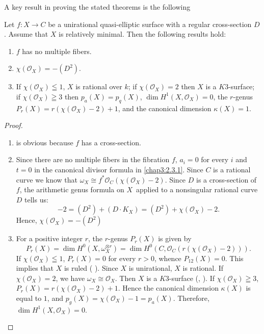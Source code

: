 \subsubsection{}\label{chap3:2.3.2}
A key result in proving the stated theorems is the following
\begin{lemma*}
Let $f:X\to C$ be a unirational quasi-elliptic surface with a regular
cross-section $D$. Assume that $X$ is relatively minimal. Then the
following results hold:
\begin{enumerate}
\renewcommand{\labelenumi}{\rm(\theenumi)}
\item $f$ has no multiple fibers.

\item $\chi(\mathscr{O}_{X})=-(D^{2})$.

\item If $\chi(\mathscr{O}_{X})\leqq 1$, $X$ is rational over $k$; if
  $\chi(\mathscr{O}_{X})=2$ then $X$ is a $K3$-surface; if
  $\chi(\mathscr{O}_{X})\geqq 3$ then $p_{a}(X)=p_{q}(X)$, $\dim
  H^{1}(X,\mathscr{O}_{X})=0$, the $r$-genus
  $P_{r}(X)=r(\chi(\mathscr{O}_{X})-2)+1$, and the canonical dimension
  $\kappa(X)=1$. 
\end{enumerate}
\end{lemma*}

\begin{proof}
\begin{enumerate}
\renewcommand{\labelenumi}{(\theenumi)}
\item is obvious because $f$ has a cross-section. 

\item Since there are no multiple fibers in the fibration $f$,
  $a_{i}=0$ for every $i$ and $t=0$ in the canonical divisor formula
  in \ref{chap3:2.3.1}. Since $C$ is a rational curve we know that
  $\omega_{X}\cong
  f^{\ast}\mathscr{O}_{C}(\chi(\mathscr{O}_{X})-2)$. Since $D$ is a
  cross-section of $f$, the arithmetic genus formula on
  $X$\pageoriginale\ applied to a nonsingular rational curve $D$ tells
  us:
$$
-2=(D^{2})+(D\cdot K_{X})=(D^{2})+\chi(\mathscr{O}_{X})-2.
$$
Hence, $\chi(\mathscr{O}_{X})=-(D^{2})$ 

\item For a positive integer $r$, the $r$-genus $P_{r}(X)$ is given by
$$
P_{r}(X)=\dim H^{0}(X,\omega^{\otimes r}_{X})=\dim
H^{0}(C,\mathscr{O}_{C}(r(\chi(\mathscr{O}_{X})-2))). 
$$
If $\chi(\mathscr{O}_{X})\leqq 1$, $P_{r}(X)=0$ for every $r>0$,
whence $P_{12}(X)=0$. This implies that $X$ is ruled (\cf
\cite{10}). Since $X$ is unirational, $X$ is rational. If
$\chi(\mathscr{O}_{X})=2$, we have $\omega_{X}\cong
\mathscr{O}_{X}$. Then $X$ is a $K3$-surface (\cf \cite{9},
\cite{10}). If $\chi(\mathscr{O}_{X})\geqq 3$,
$P_{r}(X)=r(\chi(\mathscr{O}_{X})-2)+1$. Hence the canonical dimension
$\kappa(X)$ is equal to $1$, and
$p_{g}(X)=\chi(\mathscr{O}_{X})-1=p_{a}(X)$. Therefore, $\dim
H^{1}(X,\mathscr{O}_{X})=0$.
\end{enumerate}
\end{proof}


